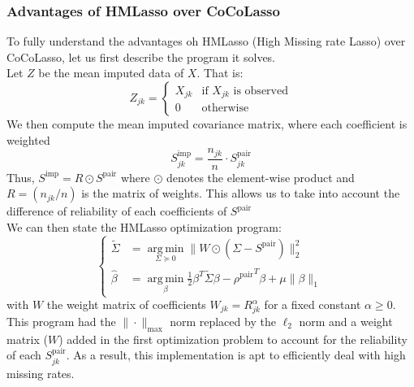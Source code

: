 \documentclass[]{article}
\DeclareMathOperator*{\argmin}{arg\,min}
\begin{document}
\subsubsection{Advantages of HMLasso over CoCoLasso}
To fully understand the advantages oh HMLasso (High Missing rate Lasso) over CoCoLasso, let us first describe the program it solves.\\
Let $Z$ be the mean imputed data of $X$. That is:
\begin{equation}
	Z_{jk} = \left\{
	\begin{array}{ll}
		X_{jk} & \mbox{if $X_{jk}$ is observed}\\
		0 & \mbox{otherwise}
	\end{array}\right.
\end{equation}
We then compute the mean imputed covariance matrix, where each coefficient is weighted 
\begin{equation}
	S^{\text{imp}}_{jk} = \frac{n_{jk}}{n}\cdot S^{\text{pair}}_{jk}
\end{equation}
Thus, $S^{\text{imp}} = R \odot S^{\text{pair}}$ where $\odot$ denotes the element-wise product and $R = (n_{jk}/n)$ is the matrix of weights. This allows us to take into account the difference of reliability of each coefficients of $S^{\text{pair}}$\\
We can then state the HMLasso optimization program:
\begin{equation}
	\label{HMLassoProgram}
	\left\{
	\begin{array}{ll}
		\tilde{\Sigma} &= \argmin\limits_{\Sigma \succeq 0} \|W\odot(\Sigma - S^{\text{pair}})\|_2^2\\
		\hat{\beta} &= \argmin\limits_{\beta} \frac{1}{2}\beta^T \tilde{\Sigma}\beta - {\rho^{\text{pair}}}^T\beta + \mu \|\beta\|_1
	\end{array}\right.
\end{equation}
with $W$ the weight matrix of coefficients $W_{jk} = R_{jk}^{\alpha}$ for a fixed constant $\alpha \geq 0$.\\

This program had the $\|\cdot \|_{\text{max}}$ norm replaced by the $\ell_2$ norm and a weight matrix ($W$) added in the first optimization problem to account for the reliability of each $S^{\text{pair}}_{jk}$. As a result, this implementation is apt to efficiently deal with high missing rates.
\end{document}
